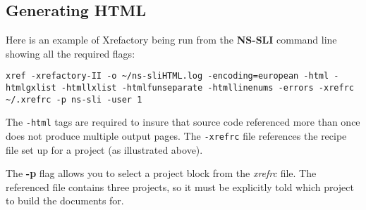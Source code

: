 \documentclass[12pt]{article}
\begin{document}
\subsection*{Generating HTML}

Here is an example of Xrefactory being run from the {\bf NS-SLI} command line showing all the required flags:

\begin{verbatim}
xref -xrefactory-II -o ~/ns-sliHTML.log -encoding=european -html -htmlgxlist -htmllxlist -htmlfunseparate -htmllinenums -errors -xrefrc ~/.xrefrc -p ns-sli -user 1
\end{verbatim}

The {\tt -html} tags are required to insure that source code referenced more than once does not produce multiple output pages. The {\tt -xrefrc} file references the recipe file set up for a project (as illustrated above).

The {\bf -p} flag allows you to select a project block from the {\it xrefrc} file. The referenced file contains three projects, so it must be explicitly told which project to build the documents for.
\end{document}
